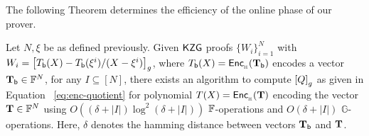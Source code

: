 \begin{comment}
        \item In addition, the other things (apart from $[Q(X)]_2$) needed for the current round of the lookup protocol are also computed by the prover as described in the lookup protocol in section 5.1 as it is just naive computation

    \end{enumerate}
    \subsection{Computation of $[Q(X)]_2$}
    Clearly, it suffices to efficiently compute $[Q(X)]_2$ where $[Q(X)]_2=\gtwo{\frac{T(X)-T_I(X)}{Z_I(X)}}$. We have the information of $[\Tbasepoly{X}-\Tbasepoly{\xi^i}/(X-\xi^i)]_2$. For this, we have the following lemma:
\end{comment}
The following Theorem determines the efficiency of the online phase of our prover.
\begin{theorem}\label{thm:approx-setup}
Let $N,\xi$ be as defined previously. Given
$\mathsf{KZG}$ proofs $\{W_i\}_{i=1}^N$ with $W_i=\left[{T_{\mathsf{b}}({X}) - T_{\mathsf{b}}({\xi^i})/(X-\xi^i)}\right]_g$, where
$T_{\mathsf{b}}({X})=\mathsf{Enc}_{{}_{\mathbb{H}}}(\mathbf{T_{\mathsf{b}}})$ encodes a vector $\mathbf{T}_{\mathsf{b}}\in \mathbb{F}^N$, for any $I\subseteq [N]$, there exists an algorithm to compute $\left[{Q}\right]_g$ as given in Equation ~\eqref{eq:enc-quotient}
for polynomial $T(X)=\mathsf{Enc}_{{}_{\mathbb{H}}}(\mathbf{T})$ encoding the vector $\mathbf{T}\in \mathbb{F}^N$ using $O((\delta + |I|) \log^2 (\delta + |I|))$ $\mathbb{F}$-operations
and $O(\delta + |I|)$ $\mathbb{G}$-operations. Here, $\delta$ denotes the hamming distance
between vectors $\mathbf{T}_{\mathsf{b}}$ and $\mathbf{T}$.
\end{theorem}
